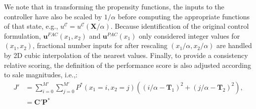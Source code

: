 \documentclass[12pt]{article}
\begin{document}
We note that in transforming the propensity functions, the inputs to the controller have also be scaled by $1/\alpha$ before computing the appropriate functions of that state, e.g., ${u}^{\mathcal{C}} = {u}^{\mathcal{C}}(\mathbf{X}/\alpha)$. Because identification of the original control formulation, $\mathbf{u}^{FAC}(x_1,x_2)$ and $\mathbf{u}^{PAC}(x_1)$ only considered integer values for $(x_1,x_2)$, fractional number inputs for after rescaling $(x_1/\alpha,x_2/\alpha)$ are handled by 2D cubic interpolation of the nearest values.
Finally, to provide a consistency relative scoring, the definition of the performance score is also adjusted according to sale magnitudes, i.e.,:
{\begin{align}
J' &= \sum_{i=0}^{M'}  \sum_{j=0}^{M'}P^*(x_1=i,x_2=j) ((i/\alpha - \mathbf T_1)^2 + (j/\alpha -\mathbf T_2)^2),\nonumber \\
& =\mathbf{C}'\mathbf{P}^*
\label{EuclidV}
\end{align}}
\end{document}
